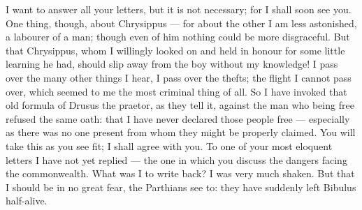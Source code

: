  I want to answer all your letters, but it is not necessary; for I shall soon see you. One thing, though, about Chrysippus --- for about the other I am less astonished, a labourer of a man; though even of him nothing could be more disgraceful. But that Chrysippus, whom I willingly looked on and held in honour for some little learning he had, should slip away from the boy without my knowledge! I pass over the many other things I hear, I pass over the thefts; the flight I cannot pass over, which seemed to me the most criminal thing of all. So I have invoked that old formula of Drusus the praetor, as they tell it, against the man who being free refused the same oath: that I have never declared those people free --- especially as there was no one present from whom they might be properly claimed. You will take this as you see fit; I shall agree with you. To one of your most eloquent letters I have not yet replied --- the one in which you discuss the dangers facing the commonwealth. What was I to write back? I was very much shaken. But that I should be in no great fear, the Parthians see to: they have suddenly left Bibulus half-alive.
